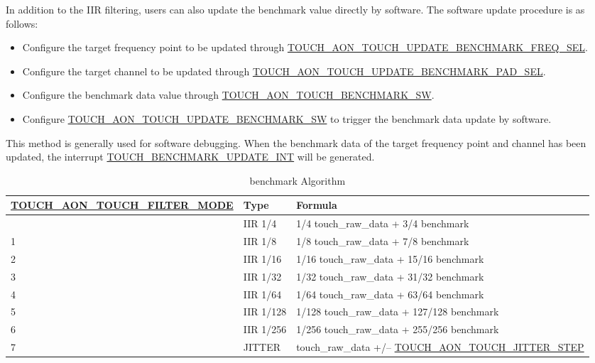 \documentclass[main\_\_EN.tex]{subfiles}
\begin{document}
\begin{enumerate}
    In addition to the IIR filtering, users can also update the benchmark value directly by software. The software update procedure is as follows:
    \begin{itemize}
      \item Configure the target frequency point to be updated through \hyperref[fielddesc:TOUCHAONTOUCHUPDATEBENCHMARKFREQSEL]{TOUCH\_AON\_TOUCH\_UPDATE\_BENCHMARK\_FREQ\_SEL}.
      \item Configure the target channel to be updated through \hyperref[fielddesc:TOUCHAONTOUCHUPDATEBENCHMARKPADSEL]{TOUCH\_AON\_TOUCH\_UPDATE\_BENCHMARK\_PAD\_SEL}.
      \item Configure the benchmark data value through \hyperref[fielddesc:TOUCHAONTOUCHBENCHMARKSW]{TOUCH\_AON\_TOUCH\_BENCHMARK\_SW}.
      \item Configure \hyperref[fielddesc:TOUCHAONTOUCHUPDATEBENCHMARKSW]{TOUCH\_AON\_TOUCH\_UPDATE\_BENCHMARK\_SW} to trigger the benchmark data update by software.
    \end{itemize}
    
    This method is generally used for software debugging. When the benchmark data of the target frequency point and channel has been updated, the interrupt \hyperref[int:TOUCHBENCHMARKUPDATEINT]{TOUCH\_BENCHMARK\_UPDATE\_INT} will be generated.

\end{enumerate}

\begin{longtable}[c]{|p{5.6 cm}|p{1.5cm}|p{8.6cm}|}
    \caption{benchmark Algorithm}\label{tab:benchmark-cal}\\
    \hline
    \rowcolor{lightgray}
    \textbf{\hyperref[fielddesc:TOUCHAONTOUCHFILTERMODE]{TOUCH\_AON\_TOUCH\_FILTER\_MODE}} & \textbf{Type} & \textbf{Formula}\\ 
    \hline
    \endhead
    \endfoot
    \endlastfoot
    0  &  IIR 1/4 & 1/4 touch\_raw\_data + 3/4 benchmark \\\hline
    1  &  IIR 1/8 & 1/8 touch\_raw\_data + 7/8 benchmark \\\hline
    2  &  IIR 1/16 & 1/16 touch\_raw\_data + 15/16 benchmark \\\hline
    3  &  IIR 1/32 & 1/32 touch\_raw\_data + 31/32 benchmark \\\hline
    4  &  IIR 1/64 & 1/64 touch\_raw\_data + 63/64 benchmark \\\hline
    5  &  IIR 1/128 & 1/128 touch\_raw\_data + 127/128 benchmark \\\hline
    6  &  IIR 1/256 & 1/256 touch\_raw\_data + 255/256 benchmark \\\hline
    7  &  JITTER & touch\_raw\_data +/$–$ \hyperref[fielddesc:TOUCHAONTOUCHJITTERSTEP]{TOUCH\_AON\_TOUCH\_JITTER\_STEP} \\\hline
\end{longtable}
\end{document}
